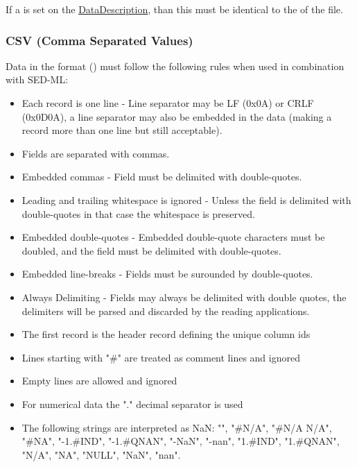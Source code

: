 If a \hyperref[sec:dimensionDescription]{} is set on the \hyperref[class:dataDescription]{DataDescription}, than this \hyperref[sec:dimensionDescription]{} must be identical to the \hyperref[sec:dimensionDescription]{} of the  file.

\subsubsection{CSV (Comma Separated Values)}
\label{sec:dataFormatCSV}
Data in the  format () must follow the following rules when used in combination with SED-ML: 

\begin{itemize}
    \item Each record is one line - Line separator may be LF (0x0A) or CRLF (0x0D0A), a line separator may also be embedded in the data (making a record more than one line but still acceptable).
    \item Fields are separated with commas.
    \item Embedded commas - Field must be delimited with double-quotes.
    \item Leading and trailing whitespace is ignored - Unless the field is delimited with double-quotes in that case the whitespace is preserved.
    \item Embedded double-quotes - Embedded double-quote characters must be doubled, and the field must be delimited with double-quotes.
    \item Embedded line-breaks - Fields must be surounded by double-quotes.
    \item Always Delimiting - Fields may always be delimited with double quotes, the delimiters will be parsed and discarded by the reading applications.
	\item The first record is the header record defining the unique column ids 
	\item Lines starting with "\#" are treated as comment lines and ignored
	\item Empty lines are allowed and ignored
	\item For numerical data the "." decimal separator is used
	\item The following strings are interpreted as NaN: "", "\#N/A", "\#N/A N/A", "\#NA", "-1.\#IND", "-1.\#QNAN", "-NaN", "-nan", "1.\#IND", "1.\#QNAN", "N/A", "NA", "NULL", "NaN", "nan".
\end{itemize}

